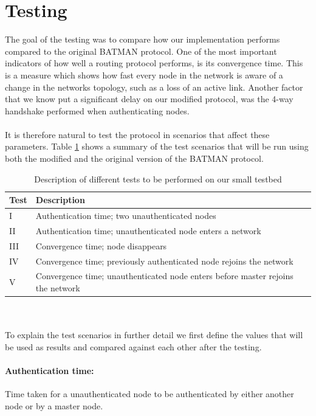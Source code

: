 \section{Testing}
The goal of the testing was to compare how our implementation performs compared to the original BATMAN protocol. One of the most important indicators of how well a routing protocol performs, is its convergence time. This is a measure which shows how fast every node in the network is aware of a change in the networks topology, such as a loss of an active link. Another factor that we know put a significant delay on our modified protocol, was the 4-way handshake performed when authenticating nodes.
\\\\
It is therefore natural to test the protocol in scenarios that affect these parameters. Table \ref{tab:our_test} shows a summary of the test scenarios that will be run using both the modified and the original version of the BATMAN protocol.
\\
\begin{table}[ht!]
	\centering
	\begin{tabular}{ | l | l | }
	\hline
	\textbf{Test} & \textbf{Description}\\ \hline
		I & Authentication time; two unauthenticated nodes \\ \hline
		II & Authentication time; unauthenticated node enters a network \\ \hline
		III & Convergence time; node disappears \\ \hline
		IV & Convergence time; previously authenticated node rejoins the network \\ \hline
		V & Convergence time; unauthenticated node enters before master rejoins the network \\ \hline
	\end{tabular}
	\caption{Description of different tests to be performed on our small testbed}
	\label{tab:our_test}
\end{table}

\noindent
\\\\
To explain the test scenarios in further detail we first define the values that will be used as results and compared against each other after the testing.

\paragraph{Authentication time:} Time taken for a unauthenticated node to be authenticated by either another node or by a master node.

